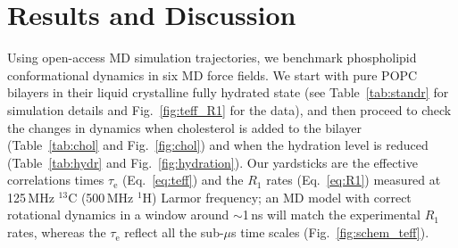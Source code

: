 \documentclass[journal=jcisd8,manuscript=article,layout=twocolumn]{achemso}
\begin{document}
\section{Results and Discussion}

Using open-access MD simulation trajectories,
we benchmark phospholipid conformational  dynamics in six
MD force fields. %
We start with
pure POPC bilayers in their liquid crystalline fully hydrated state
(see Table~\ref{tab:standr} for simulation details and Fig.~\ref{fig:teff_R1} for the data), and
then proceed to
check the changes in dynamics when cholesterol is added to the bilayer (Table~\ref{tab:chol} and Fig.~\ref{fig:chol}) and when the hydration level is reduced (Table~\ref{tab:hydr} and Fig.~\ref{fig:hydration}).
Our yardsticks are
the effective correlations times $\tau_\mathrm e$ (Eq.~\eqref{eq:teff}) and
the $R_1$ rates (Eq.~\eqref{eq:R1})
measured at 125\,MHz $^{13}$C (500\,MHz $^1$H) Larmor frequency;
an MD model with correct rotational dynamics in a window around $\sim$1\,ns
will match the experimental $R_1$ rates, whereas
the $\tau_\mathrm{e}$ reflect all the sub-$\mu$s time scales (Fig.~\ref{fig:schem_teff}).



\end{document}
